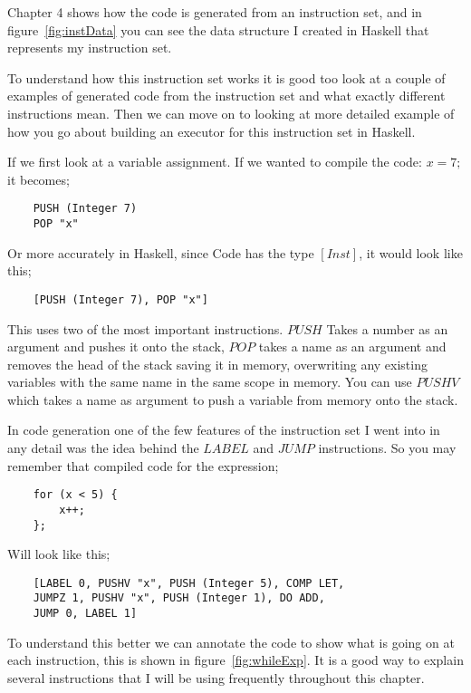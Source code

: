 Chapter 4 shows how the code is generated from an instruction set, and in figure~\ref{fig:instData} you can see the data structure I created in Haskell that represents my instruction set. 

To understand how this instruction set works it is good too look at a couple of examples of generated code from the instruction set and what exactly different instructions mean. Then we can move on to looking at more detailed example of how you go about building an executor for this instruction set in Haskell. 

If we first look at a variable assignment. If we wanted to compile the code: $x = 7;$ it becomes;

\begin{lstlisting}
	PUSH (Integer 7)
	POP "x"
\end{lstlisting}

Or more accurately in Haskell, since Code has the type $[Inst]$, it would look like this;

\begin{lstlisting}
	[PUSH (Integer 7), POP "x"]
\end{lstlisting}

This uses two of the most important instructions. $PUSH$ Takes a number as an argument and pushes it onto the stack, $POP$ takes a name as an argument and removes the head of the stack saving it in memory, overwriting any existing variables with the same name in the same scope in memory. You can use $PUSHV$ which takes a name as argument to push a variable from memory onto the stack. 

In code generation one of the few features of the instruction set I went into in any detail was the idea behind the $LABEL$ and $JUMP$ instructions. So you may remember that compiled code for the expression;

\begin{lstlisting}
	for (x < 5) {
		x++;
	};
\end{lstlisting}

Will look like this;

\begin{lstlisting}
	[LABEL 0, PUSHV "x", PUSH (Integer 5), COMP LET, 
	JUMPZ 1, PUSHV "x", PUSH (Integer 1), DO ADD, 
	JUMP 0, LABEL 1]			
\end{lstlisting}

To understand this better we can annotate the code to show what is going on at each instruction, this is shown in figure~\ref{fig:whileExp}. It is a good way to explain several instructions that I will be using frequently throughout this chapter.

